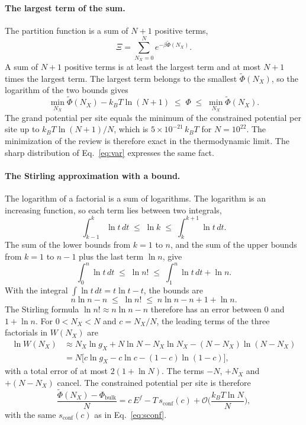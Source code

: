 \documentclass[11pt]{article}      %
\numberwithin{equation}{section}   %
\begin{document}
\paragraph{The largest term of the sum.}
The partition function is a sum of $N+1$ positive terms,
\begin{equation*}
    \Xi=\sum_{N_X=0}^{N}e^{-\beta\widetilde{\Phi}(N_X)}.
\end{equation*}
A sum of $N+1$ positive terms is at least the largest term and at most
$N+1$ times the largest term. The largest term belongs to the smallest
$\widetilde{\Phi}(N_X)$, so the logarithm of the two bounds gives
\begin{equation}
    \boxed{\min_{N_X}\widetilde{\Phi}(N_X)-k_BT\ln(N+1)
    \;\leq\;\Phi\;\leq\;\min_{N_X}\widetilde{\Phi}(N_X).}
    \label{eq:largest}
\end{equation}
The grand potential per site equals the minimum of the constrained
potential per site up to $k_BT\ln(N+1)/N$, which is $5\times10^{-21}\,k_BT$
for $N=10^{22}$. The minimization of the review is therefore exact in the
thermodynamic limit. The sharp distribution of Eq.~\eqref{eq:var} expresses
the same fact.

\paragraph{The Stirling approximation with a bound.}
The logarithm of a factorial is a sum of logarithms. The logarithm is an
increasing function, so each term lies between two integrals,
\begin{equation*}
    \int_{k-1}^{k}\ln t\,dt\;\leq\;\ln k\;\leq\;\int_{k}^{k+1}\ln t\,dt.
\end{equation*}
The sum of the lower bounds from $k=1$ to $n$, and the sum of the upper
bounds from $k=1$ to $n-1$ plus the last term $\ln n$, give
\begin{equation*}
    \int_0^{n}\ln t\,dt\;\leq\;\ln n!\;\leq\;\int_1^{n}\ln t\,dt+\ln n.
\end{equation*}
With the integral $\int\ln t\,dt=t\ln t-t$, the bounds are
\begin{equation}
    \boxed{n\ln n-n\;\leq\;\ln n!\;\leq\;n\ln n-n+1+\ln n.}
    \label{eq:stirling}
\end{equation}
The Stirling formula $\ln n!\approx n\ln n-n$ therefore has an error between
$0$ and $1+\ln n$. For $0<N_X<N$ and $c=N_X/N$, the leading terms of the
three factorials in $W(N_X)$ are
\begin{align*}
    \ln W(N_X)
    &\approx N_X\ln g_X+N\ln N-N_X\ln N_X-(N-N_X)\ln(N-N_X)\\
    &=N\big[c\ln g_X-c\ln c-(1-c)\ln(1-c)\big],
\end{align*}
with a total error of at most $2(1+\ln N)$. The terms $-N$, $+N_X$ and
$+(N-N_X)$ cancel. The constrained potential per site is therefore
\begin{equation}
    \boxed{\frac{\widetilde{\Phi}(N_X)-\Phi_{\text{bulk}}}{N}
    =c\,E^f-T\,s_{\text{conf}}(c)
    +\mathcal{O}\!\Big(\frac{k_BT\ln N}{N}\Big),}
    \label{eq:phi-c}
\end{equation}
with the same $s_{\text{conf}}(c)$ as in Eq.~\eqref{eq:sconf}.
\end{document}

